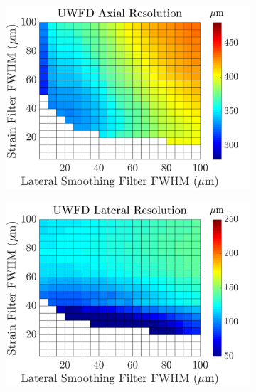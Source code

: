 {\begin{figure}[h!]
\begin{subfigure}{0.49\textwidth}
		\includegraphics[width=\textwidth]{imageres_figs/uwfd_axial.png}
	\end{subfigure}
	\begin{subfigure}{0.49\textwidth}
		\centering
		\includegraphics[width=\textwidth]{imageres_figs/uwfd_lateral.png}
	\end{subfigure}
	\\
	\begin{subfigure}{0.49\textwidth}
		\centering

\end{subfigure}
\end{figure}}
